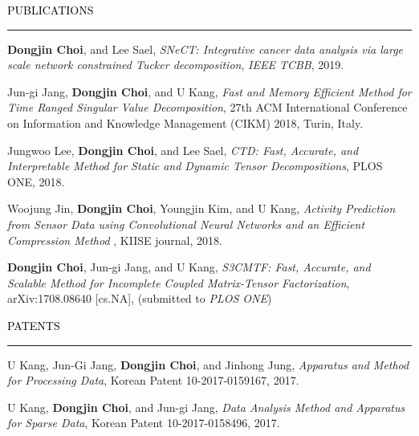 \documentclass{resume} %
\renewenvironment{rSection}[1]{
	\sectionskip
	\textcolor{Black}{\MakeUppercase{#1}}
	\sectionlineskip
	\hrule
	\begin{list}{}{
			\setlength{\leftmargin}{1.5em}
		}
		\item[]
	}{
	\end{list}
}
\begin{document}
\begin{rSection}{Publications}
\begin{rSubsection}{}{}{}{}
	\vspace*{-2.5mm}
	
	\item \textbf{Dongjin Choi}, and Lee Sael, \textit{SNeCT: Integrative cancer data analysis via large scale network constrained Tucker decomposition}, \textit{IEEE TCBB}, 2019.
	
	\item Jun-gi Jang, \textbf{Dongjin Choi}, and U Kang, \textit{Fast and Memory Efficient Method for Time Ranged Singular Value Decomposition}, 27th ACM International Conference on Information and Knowledge Management (CIKM) 2018, Turin, Italy.
	
	\item Jungwoo Lee, \textbf{Dongjin Choi}, and Lee Sael, \textit{CTD: Fast, Accurate, and Interpretable Method for Static and Dynamic Tensor Decompositions}, PLOS ONE, 2018.
	
	\item Woojung Jin, \textbf{Dongjin Choi}, Youngjin Kim, and U Kang, \textit{Activity Prediction from Sensor Data using Convolutional Neural Networks and an Efficient Compression Method }, KIISE journal, 2018.
	
	\item \textbf{Dongjin Choi}, Jun-gi Jang, and U Kang, \textit{S3CMTF: Fast, Accurate, and Scalable Method for Incomplete Coupled Matrix-Tensor Factorization}, arXiv:1708.08640 [cs.NA], (submitted to \textit{PLOS ONE})
	
\end{rSubsection}

\end{rSection}
\vspace{-3mm}



\begin{rSection}{Patents}
	\begin{rSubsection}{}{}{}{}
		\vspace*{-2.5mm}
		\item U Kang, Jun-Gi Jang, \textbf{Dongjin Choi}, and Jinhong Jung, \textit{Apparatus and Method for Processing Data}, Korean Patent 10-2017-0159167, 2017.
		\item U Kang, \textbf{Dongjin Choi}, and Jun-gi Jang, \textit{Data Analysis Method and Apparatus for Sparse Data}, Korean Patent 10-2017-0158496, 2017.
	\end{rSubsection}
	
\end{rSection}
\vspace{-3mm}
\end{document}
